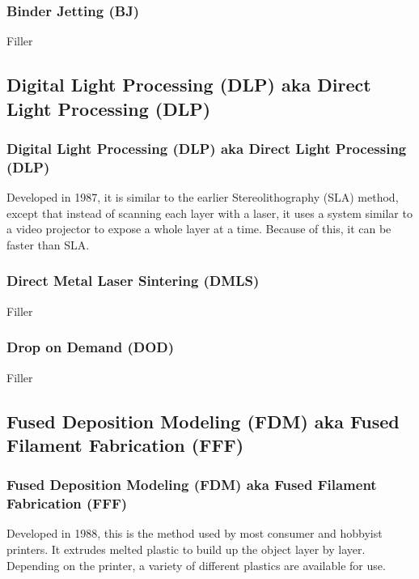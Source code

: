 \documentclass[english,10pt]{beamer}
\begin{document}
\begin{frame}
  \frametitle{Binder Jetting (BJ)}
  Filler
\end{frame}

\subsection{Digital Light Processing (DLP) aka Direct Light Processing (DLP)}
\begin{frame}
  \frametitle{Digital Light Processing (DLP) aka Direct Light Processing (DLP)}
  Developed in 1987, it is similar to the earlier Stereolithography (SLA) method, except that instead of scanning each layer with a laser, it uses a system similar to a video projector to expose a whole layer at a time.  Because of this, it can be faster than SLA.
\end{frame}

\begin{frame}
  \frametitle{Direct Metal Laser Sintering (DMLS)}
  Filler
\end{frame}

\begin{frame}
  \frametitle{Drop on Demand (DOD)}
  Filler
\end{frame}

\subsection{Fused Deposition Modeling (FDM) aka Fused Filament Fabrication (FFF)}
\begin{frame}
  \frametitle{Fused Deposition Modeling (FDM) aka Fused Filament Fabrication (FFF)}
  Developed in 1988, this is the method used by most consumer and hobbyist printers.  It extrudes melted plastic to build up the object layer by layer.  Depending on the printer, a variety of different plastics are available for use.
\end{frame}
\end{document}
